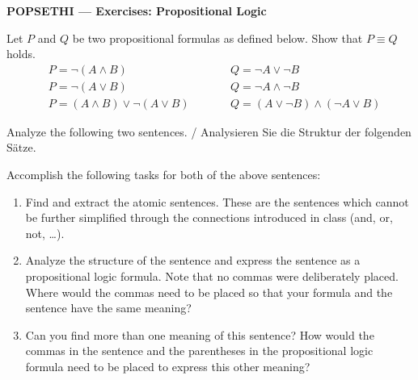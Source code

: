 \documentclass[12pt,a4paper]{exam}
\begin{document}
\begin{center}
  {\Large \textbf{POPSETHI — Exercises: Propositional Logic}}
\end{center}

\begin{questions}


Let $P$ and $Q$ be two propositional formulas as defined below. Show that $P \equiv Q$ holds.
\[
\begin{aligned}
& P = \neg(A \land B) \qquad && Q = \neg A \lor \neg B \\[0.35em]
& P = \neg(A \lor B) \qquad && Q = \neg A \land \neg B \\[0.35em]
& P = (A \land B) \lor \neg(A \lor B) \qquad && Q = (A \lor \neg B)\land(\neg A \lor B)
\end{aligned}
\]


Analyze the following two sentences. / Analysieren Sie die Struktur der folgenden Sätze.

Accomplish the following tasks for both of the above sentences:

\begin{enumerate}
  \item Find and extract the atomic sentences. These are the sentences which cannot be further simplified through the connections introduced in class (and, or, not, \dots).
  \item Analyze the structure of the sentence and express the sentence as a propositional logic formula. Note that no commas were deliberately placed. Where would the commas need to be placed so that your formula and the sentence have the same meaning?
  \item Can you find more than one meaning of this sentence? How would the commas in the sentence and the parentheses in the propositional logic formula need to be placed to express this other meaning?
\end{enumerate}


\end{questions}
\end{document}
